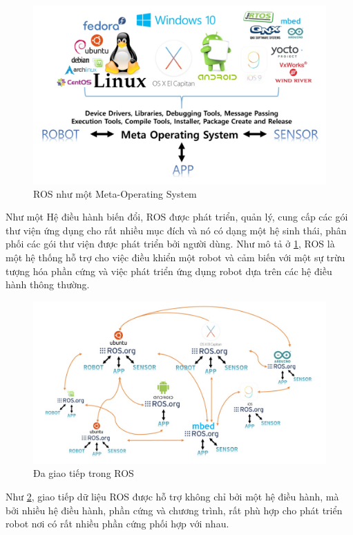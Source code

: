 \begin{figure}[htp]
	\centering
	\includegraphics[width=1\linewidth]{chapter2/figs/meta_operatingSystem.pdf}
	\caption{ROS như một Meta-Operating System}
	\label{fig:ROSasMetaOS}
\end{figure}

Như một Hệ điều hành biến đổi, ROS được phát triển, quản lý, cung cấp các gói thư viện ứng dụng cho rất nhiều mục đích và nó có dạng một hệ sinh thái, phân phối các gói thư viện được phát triển bởi người dùng. Như mô tả ở \figurename{\ref{fig:ROSasMetaOS}}, ROS là một hệ thống hỗ trợ cho việc điều khiển một robot và cảm biến với một sự trừu tượng hóa phần cứng và việc phát triển ứng dụng robot dựa trên các hệ điều hành thông thường.

\begin{figure}[htp]
	\centering
	\includegraphics[width=1\linewidth]{chapter2/figs/multi_communication.pdf}
	\caption{Đa giao tiếp trong ROS}
	\label{fig:MultiCommunication}
\end{figure}

Như \figurename{\ref{fig:MultiCommunication}}, giao tiếp dữ liệu ROS được hỗ trợ không chỉ bởi một hệ điều hành, mà bởi nhiều hệ điều hành, phần cứng và chương trình, rất phù hợp cho phát triển robot nơi có rất nhiều phần cứng phối hợp với nhau. 
\cite{Pyo2017}

